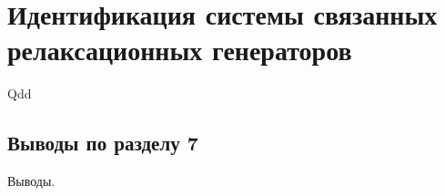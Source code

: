 \chapter{Идентификация системы связанных релаксационных генераторов}

Qdd

\section{Выводы по разделу 7}

Выводы.

